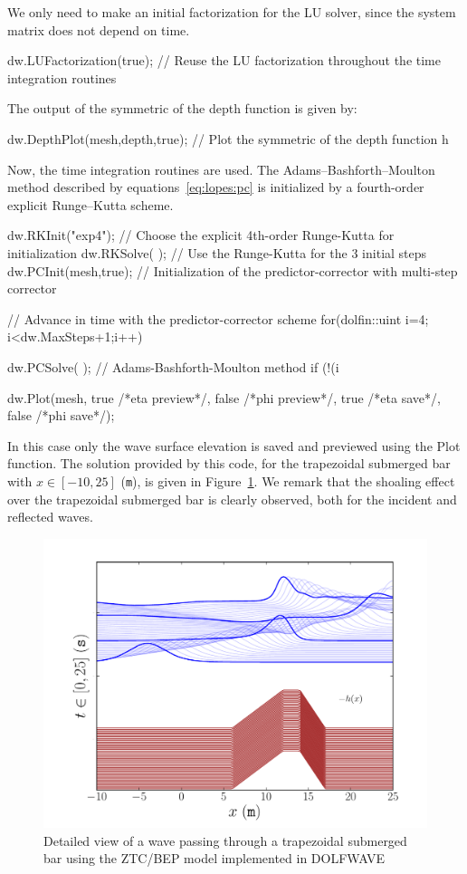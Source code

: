We only need to make an initial factorization for the LU solver, since
the system matrix does not depend on time.
\begin{c++}
dw.LUFactorization(true); // Reuse the LU factorization throughout the time integration routines
\end{c++}
The output of the symmetric of the depth function is given by:
\begin{c++}
dw.DepthPlot(mesh,depth,true); // Plot the symmetric of the depth function h
\end{c++}
Now, the time integration routines are used.
The Adams--Bashforth--Moulton method described by
equations~\eqref{eq:lopes:pc} is initialized by a fourth-order explicit
Runge--Kutta scheme.
\begin{c++}
dw.RKInit("exp4");    // Choose the explicit 4th-order Runge-Kutta for initialization
dw.RKSolve( );        // Use the Runge-Kutta for the 3 initial steps
dw.PCInit(mesh,true); // Initialization of the predictor-corrector with multi-step corrector

// Advance in time with the predictor-corrector scheme
for(dolfin::uint i=4; i<dw.MaxSteps+1;i++)
{
  dw.PCSolve( ); // Adams-Bashforth-Moulton method
  if (!(i%

  dw.Plot(mesh, true /*eta preview*/, false /*phi preview*/,
          true /*eta save*/, false /*phi save*/);
}
\end{c++}
In this case only the wave surface elevation is saved and previewed
using the Plot function.  The solution provided by this code, for the
trapezoidal submerged bar with $x\in[-10,25]$ ({\tt m}), is given in
Figure~\ref{fig:lopes:submergedbar}.  We remark that the shoaling
effect over the trapezoidal submerged bar is clearly observed, both
for the incident and reflected waves.

\begin{figure}
  \centering
  \includegraphics[width=\largefig]{chapters/lopes/pdf/submergedbar.pdf}
  \caption{Detailed view of a wave passing through a trapezoidal
    submerged bar using the ZTC/BEP model implemented in DOLFWAVE}
  \label{fig:lopes:submergedbar}
\end{figure}

